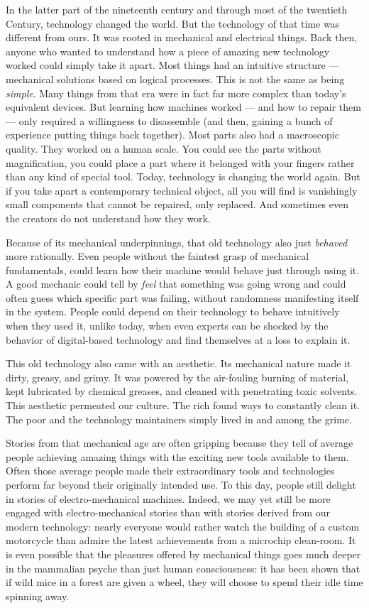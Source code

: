 \documentclass[
]{scrbook}
\begin{document}
In the latter part of the nineteenth century and through most of the
twentieth Century, technology changed the world. But the technology of
that time was different from ours. It was rooted in mechanical and
electrical things. Back then, anyone who wanted to understand how a
piece of amazing new technology worked could simply take it apart. Most
things had an intuitive structure --- mechanical solutions based on
logical processes. This is not the same as being \emph{simple}. Many
things from that era were in fact far more complex than today's
equivalent devices. But learning how machines worked --- and how to
repair them --- only required a willingness to disassemble (and then,
gaining a bunch of experience putting things back together). Most parts
also had a macroscopic quality. They worked on a human scale. You could
see the parts without magnification, you could place a part where it
belonged with your fingers rather than any kind of special tool. Today,
technology is changing the world again. But if you take apart a
contemporary technical object, all you will find is vanishingly small
components that cannot be repaired, only replaced. And sometimes even
the creators do not understand how they work.

Because of its mechanical underpinnings, that old technology also just
\emph{behaved} more rationally. Even people without the faintest grasp
of mechanical fundamentals, could learn how their machine would behave
just through using it. A good mechanic could tell by \emph{feel} that
something was going wrong and could often guess which specific part was
failing, without randomness manifesting itself in the system. People
could depend on their technology to behave intuitively when they used
it, unlike today, when even experts can be shocked by the behavior of
digital-based technology and find themselves at a loss to explain it.

This old technology also came with an aesthetic. Its mechanical nature
made it dirty, greasy, and grimy. It was powered by the air-fouling
burning of material, kept lubricated by chemical greases, and cleaned
with penetrating toxic solvents. This aesthetic permeated our culture.
The rich found ways to constantly clean it. The poor and the technology
maintainers simply lived in and among the grime.

Stories from that mechanical age are often gripping because they tell of
average people achieving amazing things with the exciting new tools
available to them. Often those average people made their extraordinary
tools and technologies perform far beyond their originally intended use.
To this day, people still delight in stories of electro-mechanical
machines. Indeed, we may yet still be more engaged with
electro-mechanical stories than with stories derived from our modern
technology: nearly everyone would rather watch the building of a custom
motorcycle than admire the latest achievements from a microchip
clean-room. It is even possible that the pleasures offered by mechanical
things goes much deeper in the mammalian psyche than just human
consciousness: it has been shown that if wild mice in a forest are given
a wheel, they will choose to spend their idle time spinning away.
\end{document}
